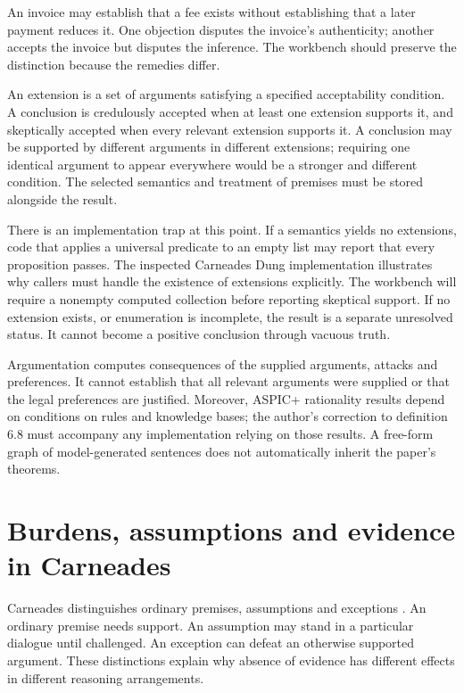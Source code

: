 \documentclass[12pt,a4paper,oneside,openany]{book}
\begin{document}
An invoice may establish that a fee exists without establishing that a later payment reduces it. One objection disputes the invoice's authenticity; another accepts the invoice but disputes the inference. The workbench should preserve the distinction because the remedies differ.


An extension is a set of arguments satisfying a specified acceptability
condition. A conclusion is credulously accepted when at least one extension
supports it, and skeptically accepted when every relevant extension supports it.
A conclusion may be supported by different arguments in different extensions;
requiring one identical argument to appear everywhere would be a stronger and
different condition. The selected semantics and treatment of premises must be
stored alongside the result.

There is an implementation trap at this point. If a semantics yields no
extensions, code that applies a universal predicate to an empty list may report
that every proposition passes. The inspected Carneades Dung implementation
illustrates why callers must handle the existence of extensions explicitly. The
workbench will require a nonempty computed collection before reporting skeptical
support. If no extension exists, or enumeration is incomplete, the result is a
separate unresolved status. It cannot become a positive conclusion through
vacuous truth.

Argumentation computes consequences of the supplied arguments, attacks and
preferences. It cannot establish that all relevant arguments were supplied or
that the legal preferences are justified. Moreover, ASPIC+ rationality results
depend on conditions on rules and knowledge bases; the author's correction to
definition 6.8 must accompany any implementation relying on those results. A
free-form graph of model-generated sentences does not automatically inherit the
paper's theorems.

\section{Burdens, assumptions and evidence in Carneades}
\label{merge:M05:05}


Carneades distinguishes ordinary premises, assumptions and exceptions
\citep[sections 3--6]{carneades2007}. An ordinary premise needs support. An
assumption may stand in a particular dialogue until challenged. An exception can
defeat an otherwise supported argument. These distinctions explain why absence
of evidence has different effects in different reasoning arrangements.
\end{document}
